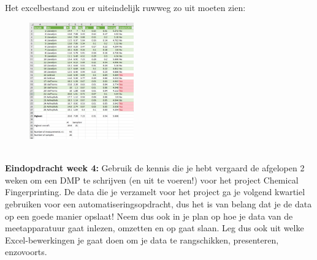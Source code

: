 Het excelbestand zou er uiteindelijk ruwweg zo uit moeten zien:
\begin{figure}[h]
\begin{center}
\includegraphics[width=0.4\textwidth]{img/xlsx.png}
\end{center}
\end{figure}
\\
\color{saxion}\textbf{Eindopdracht week 4: }\color{black} Gebruik de kennis die je hebt vergaard de afgelopen 2 weken om een DMP te schrijven (en uit te voeren!) voor het project Chemical Fingerprinting. De data die je verzamelt voor het project ga je volgend kwartiel gebruiken voor een automatiseringsopdracht, dus het is van belang dat je de data op een goede manier opslaat! Neem dus ook in je plan op hoe je data van de meetapparatuur gaat inlezen, omzetten en op gaat slaan. Leg dus ook uit welke Excel-bewerkingen je gaat doen om je data te rangschikken, presenteren, enzovoorts. 